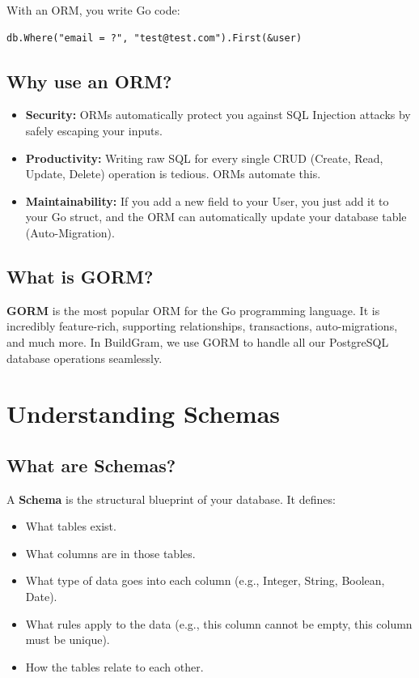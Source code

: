 \documentclass[11pt,a4paper]{article}
\begin{document}
With an ORM, you write Go code:
\begin{lstlisting}
db.Where("email = ?", "test@test.com").First(&user)
\end{lstlisting}

\subsection{Why use an ORM?}
\begin{itemize}
    \item \textbf{Security:} ORMs automatically protect you against SQL Injection attacks by safely escaping your inputs.
    \item \textbf{Productivity:} Writing raw SQL for every single CRUD (Create, Read, Update, Delete) operation is tedious. ORMs automate this.
    \item \textbf{Maintainability:} If you add a new field to your User, you just add it to your Go struct, and the ORM can automatically update your database table (Auto-Migration).
\end{itemize}

\subsection{What is GORM?}
\textbf{GORM} is the most popular ORM for the Go programming language. It is incredibly feature-rich, supporting relationships, transactions, auto-migrations, and much more. In BuildGram, we use GORM to handle all our PostgreSQL database operations seamlessly.

\section{Understanding Schemas}
\subsection{What are Schemas?}
A \textbf{Schema} is the structural blueprint of your database. It defines:
\begin{itemize}
    \item What tables exist.
    \item What columns are in those tables.
    \item What type of data goes into each column (e.g., Integer, String, Boolean, Date).
    \item What rules apply to the data (e.g., this column cannot be empty, this column must be unique).
    \item How the tables relate to each other.
\end{itemize}
\end{document}
